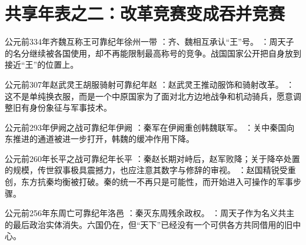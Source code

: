 \section{共享年表之二：改革竞赛变成吞并竞赛}

\begin{event}{公元前334年}{齐魏互称王}{可靠纪年}{徐州一带}
：齐、魏相互承认“王”号。
：周天子的名分继续被各国使用，却不再能限制最高称号的竞争。战国国家公开把自身放到接近“王”的位置上。
\end{event}

\begin{event}{公元前307年}{赵武灵王胡服骑射}{可靠纪年}{赵}
：赵武灵王推动服饰和骑射改革。
：这不是单纯换衣服，而是一个中原国家为了面对北方边地战争和机动骑兵，愿意调整旧有身份象征与军事技术。
\end{event}

\begin{event}{公元前293年}{伊阙之战}{可靠纪年}{伊阙}
：秦军在伊阙重创韩魏联军。
：关中秦国向东推进的通道被进一步打开，韩魏的缓冲作用下降。
\end{event}

\begin{event}{公元前260年}{长平之战}{可靠纪年}{长平}
：秦赵长期对峙后，赵军败降；关于降卒处置的规模，传世叙事极具震撼力，也应注意其数字与修辞的审视。
：赵国精锐受重创，东方抗秦均衡被打破。秦的统一不再只是可能性，而开始进入可操作的军事步骤。
\end{event}

\begin{event}{公元前256年}{东周亡}{可靠纪年}{洛邑}
：秦灭东周残余政权。
：周天子作为名义共主的最后政治实体消失。六国仍在，但“天下”已经没有一个可供各方共同借用的旧中心。
\end{event}
